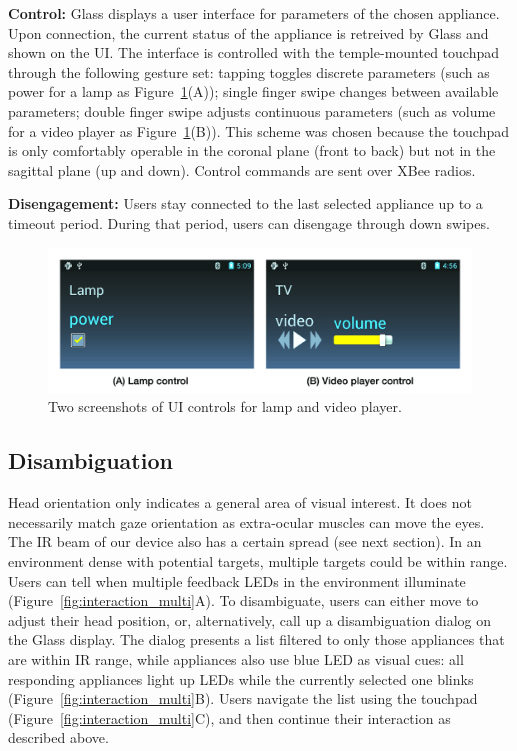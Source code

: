 \documentclass{sigchi}
\begin{document}
{\bf Control:} Glass displays a user interface for parameters of the chosen appliance. Upon connection, the current status of the appliance is retreived by Glass and shown on the UI. The interface is controlled with the temple-mounted touchpad through the following gesture set: tapping toggles discrete parameters (such as power for a lamp as Figure~\ref{fig:ui_controls}(A)); single finger swipe changes between available parameters; double finger swipe adjusts continuous parameters (such as volume for a video player as Figure~\ref{fig:ui_controls}(B)). This scheme was chosen because the touchpad is only comfortably operable in the coronal plane (front to back) but not in the sagittal plane (up and down). 
Control commands are sent over XBee radios.

{\bf Disengagement:} Users stay connected to the last selected appliance up to a timeout period. During that period, users can disengage through down swipes.

\begin{figure}[t!]
\centering
\includegraphics[width=\columnwidth]{figures/ui_controls_caption.jpg}
\caption{Two screenshots of UI controls for lamp and video player.}
\label{fig:ui_controls}
\end{figure}

\subsection{Disambiguation}
Head orientation only indicates a general area of visual interest. It does not necessarily match gaze orientation as extra-ocular muscles can move the eyes. The IR beam of our device also has a certain spread (see next section). In an environment dense with potential targets, multiple targets could be within range. Users can tell when multiple feedback LEDs in the environment illuminate (Figure~\ref{fig:interaction_multi}A). To disambiguate, users can either move to adjust their head position, or, alternatively, call up a disambiguation dialog on the Glass display. The dialog presents a list filtered to only those appliances that are within IR range, while appliances also use blue LED as visual cues: all responding appliances light up LEDs while the currently selected one blinks (Figure~\ref{fig:interaction_multi}B). Users navigate the list using the touchpad (Figure~\ref{fig:interaction_multi}C), and then continue their interaction as described above.
\end{document}
